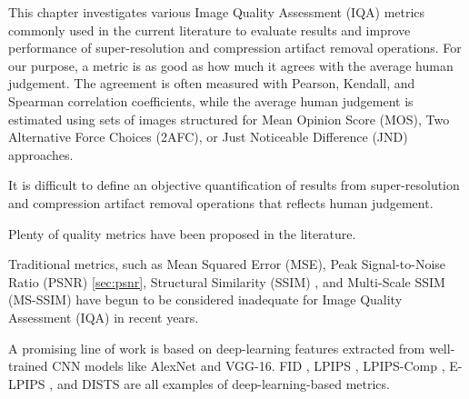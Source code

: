 \label{chap:metrics}




This chapter investigates various Image Quality Assessment (IQA) metrics commonly used in the current literature to evaluate results and improve performance of super-resolution and compression artifact removal operations.
For our purpose, a metric is as good as how much it agrees with the average human judgement.
The agreement is often measured with Pearson, Kendall, and Spearman correlation coefficients, while the average human judgement is estimated using sets of images structured for Mean Opinion Score (MOS), Two Alternative Force Choices (2AFC), or Just Noticeable Difference (JND) approaches.


It is difficult to define an objective quantification of results from super-resolution and compression artifact removal operations that reflects human judgement.

Plenty of quality metrics have been proposed in the literature.

Traditional metrics, such as Mean Squared Error (MSE), Peak Signal-to-Noise Ratio (PSNR) \ref{sec:psnr}, Structural Similarity (SSIM) \cite{wang2004image}, and Multi-Scale SSIM (MS-SSIM) \cite{wang2003multiscale} have begun to be considered inadequate for Image Quality Assessment (IQA) in recent years.

A promising line of work is based on deep-learning features extracted from well-trained CNN models like AlexNet and VGG-16.
FID \cite{heusel2017gans}, LPIPS \cite{zhang2018unreasonable}, LPIPS-Comp \cite{patel2021saliency}, E-LPIPS \cite{kettunen2019lpips}, and DISTS \cite{ding2020image} are all examples of deep-learning-based metrics.

